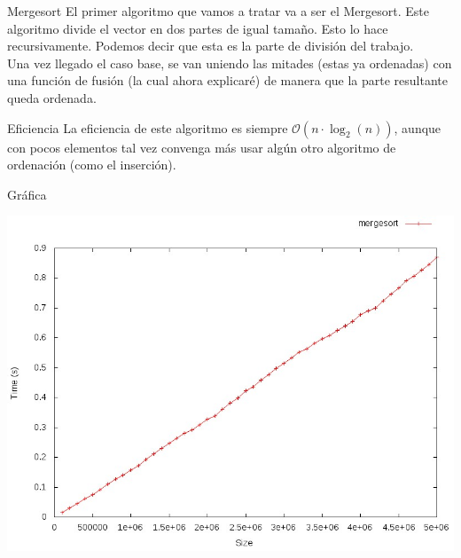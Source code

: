 \documentclass[compress]{beamer}
\begin{document}
\begin{frame}{Mergesort}
El primer algoritmo que vamos a tratar va a ser el Mergesort. Este algoritmo divide el vector en dos partes de igual tamaño. Esto lo hace recursivamente. Podemos decir que esta es la parte de división del trabajo.\\
\vspace{0.20in}
Una vez llegado el caso base, se van uniendo las mitades (estas ya ordenadas) con una función de fusión (la cual ahora explicaré) de manera que la parte resultante queda ordenada.\\
\vspace{0.20in}
	\begin{block}{Eficiencia}
	La eficiencia de este algoritmo es siempre $\mathcal{O}(n\cdot\log_2(n))$, aunque con pocos elementos tal vez convenga más usar algún otro algoritmo de ordenación (como el inserción).
	\end{block}
\end{frame}

\begin{frame}{Gráfica}
	\begin{alertblock}{}
		\begin{center}
		\includegraphics[scale=0.40]{images/mergesort.jpeg}
		\end{center}
	\end{alertblock}
\end{frame}
\end{document}
